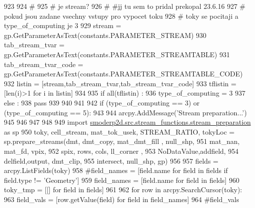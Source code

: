 \begin{DoxyCode}
923 
924   \textcolor{comment}{#
}
925   \textcolor{comment}{#  je stream?
}
926   \textcolor{comment}{# #jj tu sem to pridal prekopal 23.6.16
}
927   \textcolor{comment}{# pokud jsou zadane vsechny vstupy pro vypocet toku
}
928   \textcolor{comment}{# toky se pocitaji a type\_of\_computing je 3
}
929   stream = gp.GetParameterAsText(constants.PARAMETER\_STREAM)
930   tab\_stream\_tvar = gp.GetParameterAsText(constants.PARAMETER\_STREAMTABLE)
931   tab\_stream\_tvar\_code = gp.GetParameterAsText(constants.PARAMETER\_STREAMTABLE\_CODE)
932   listin = [stream,tab\_stream\_tvar,tab\_stream\_tvar\_code]
933   tflistin = [len(i)>1 \textcolor{keywordflow}{for} i \textcolor{keywordflow}{in} listin]
934 
935   \textcolor{keywordflow}{if} all(tflistin) :
936     type\_of\_computing = 3
937   \textcolor{keywordflow}{else} :
938     \textcolor{keywordflow}{pass}
939 
940 
941 
942   \textcolor{keywordflow}{if} (type\_of\_computing == 3) \textcolor{keywordflow}{or} (type\_of\_computing == 5):
943 
944     arcpy.AddMessage(\textcolor{stringliteral}{'Stream preparation...'})
945 
946 
947 
948 
949     \textcolor{keyword}{import} \hyperlink{namespacesmoderp2d_1_1src_1_1stream__functions_1_1stream__preparation}{smoderp2d.src.stream\_functions.stream\_preparation}
       \textcolor{keyword}{as} sp
950     toky, cell\_stream, mat\_tok\_usek, STREAM\_RATIO, tokyLoc = sp.prepare\_streams(dmt, dmt\_copy, mat\_dmt\_fill
      , null\_shp,
951                                                                                 mat\_nan, mat\_fd, vpix,
952                                                                                 spix, rows, cols, ll\_corner
      ,
953                                                                                 NoDataValue,addfield,
954                                                                                 delfield,output, dmt\_clip,
955                                                                                 intersect, null\_shp, gp)
956 
957     fields = arcpy.ListFields(toky)
958     \textcolor{comment}{#field\_names = [field.name for field in fields if field.type != 'Geometry']
}
959     field\_names = [field.name \textcolor{keywordflow}{for} field \textcolor{keywordflow}{in} fields]
960     toky\_tmp = [[] \textcolor{keywordflow}{for} field \textcolor{keywordflow}{in} fields]
961 
962     \textcolor{keywordflow}{for} row \textcolor{keywordflow}{in} arcpy.SearchCursor(toky):
963       field\_vals = [row.getValue(field) \textcolor{keywordflow}{for} field \textcolor{keywordflow}{in} field\_names]
964       \textcolor{comment}{#field\_vals
}
\end{DoxyCode}
